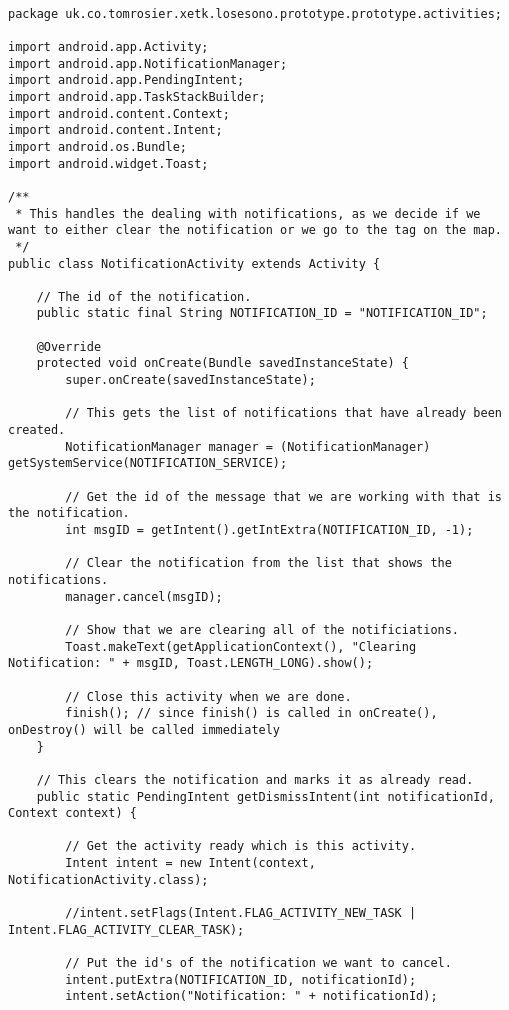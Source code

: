 \begin{lstlisting}

package uk.co.tomrosier.xetk.losesono.prototype.prototype.activities;

import android.app.Activity;
import android.app.NotificationManager;
import android.app.PendingIntent;
import android.app.TaskStackBuilder;
import android.content.Context;
import android.content.Intent;
import android.os.Bundle;
import android.widget.Toast;

/**
 * This handles the dealing with notifications, as we decide if we want to either clear the notification or we go to the tag on the map.
 */
public class NotificationActivity extends Activity {

    // The id of the notification.
    public static final String NOTIFICATION_ID = "NOTIFICATION_ID";

    @Override
    protected void onCreate(Bundle savedInstanceState) {
        super.onCreate(savedInstanceState);

        // This gets the list of notifications that have already been created.
        NotificationManager manager = (NotificationManager) getSystemService(NOTIFICATION_SERVICE);

        // Get the id of the message that we are working with that is the notification.
        int msgID = getIntent().getIntExtra(NOTIFICATION_ID, -1);

        // Clear the notification from the list that shows the notifications.
        manager.cancel(msgID);

        // Show that we are clearing all of the notificiations.
        Toast.makeText(getApplicationContext(), "Clearing Notification: " + msgID, Toast.LENGTH_LONG).show();

        // Close this activity when we are done.
        finish(); // since finish() is called in onCreate(), onDestroy() will be called immediately
    }

    // This clears the notification and marks it as already read.
    public static PendingIntent getDismissIntent(int notificationId, Context context) {

        // Get the activity ready which is this activity.
        Intent intent = new Intent(context, NotificationActivity.class);

        //intent.setFlags(Intent.FLAG_ACTIVITY_NEW_TASK | Intent.FLAG_ACTIVITY_CLEAR_TASK);

        // Put the id's of the notification we want to cancel.
        intent.putExtra(NOTIFICATION_ID, notificationId);
        intent.setAction("Notification: " + notificationId);


\end{lstlisting}
